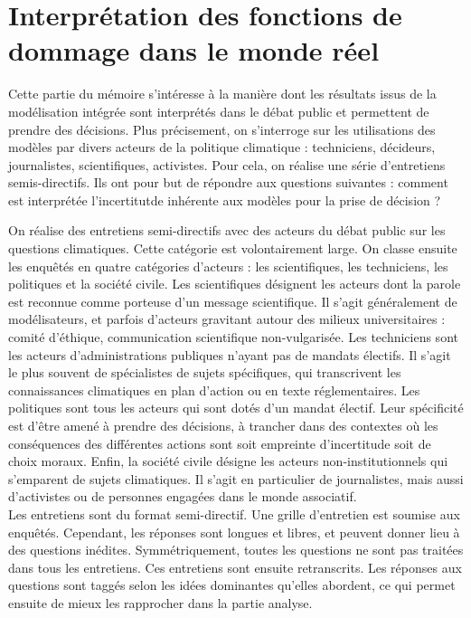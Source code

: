 \chapter{Interprétation des fonctions de dommage dans le monde réel}
\label{chapter:socio}



Cette partie du mémoire s'intéresse à la manière dont les résultats issus de la modélisation intégrée sont interprétés dans le débat public et permettent de prendre des décisions. Plus précisement, on s'interroge sur les utilisations des modèles par divers acteurs de la politique climatique : techniciens, décideurs, journalistes, scientifiques, activistes.  Pour cela, on réalise une série d'entretiens semis-directifs. Ils ont pour but de répondre aux questions suivantes : comment est interprétée l'incertitutde inhérente aux modèles pour la prise de décision ? 



\begin{methodbox}

On réalise des entretiens semi-directifs avec des acteurs du débat public sur les questions climatiques. Cette catégorie est volontairement large. On classe ensuite les enquêtés en quatre catégories d'acteurs : les scientifiques, les techniciens, les politiques et la société civile. Les scientifiques désignent les acteurs dont la parole est reconnue comme porteuse d'un message scientifique. Il s'agit généralement de modélisateurs, et parfois d'acteurs gravitant autour des milieux universitaires : comité d'éthique, communication scientifique non-vulgarisée. Les techniciens sont les acteurs d'administrations publiques n'ayant pas de mandats électifs. Il s'agit le plus souvent de spécialistes de sujets spécifiques, qui transcrivent les connaissances climatiques en plan d'action ou en texte réglementaires. Les politiques sont tous les acteurs qui sont dotés d'un mandat électif. Leur spécificité est d'être amené à prendre des décisions, à trancher dans des contextes où les conséquences des différentes actions sont soit empreinte d'incertitude soit de choix moraux. Enfin, la société civile désigne les acteurs non-institutionnels qui s'emparent de sujets climatiques. Il s'agit en particulier de journalistes, mais aussi d'activistes ou de personnes engagées dans le monde associatif. \\

Les entretiens sont du format semi-directif. Une grille d'entretien est soumise aux enquêtés. Cependant, les réponses sont longues et libres, et peuvent donner lieu à des questions inédites. Symmétriquement, toutes les questions ne sont pas traitées dans tous les entretiens. Ces entretiens sont ensuite retranscrits. Les réponses aux questions sont taggés selon les idées dominantes qu'elles abordent, ce qui permet ensuite de mieux les rapprocher dans la partie analyse. 


\end{methodbox}










